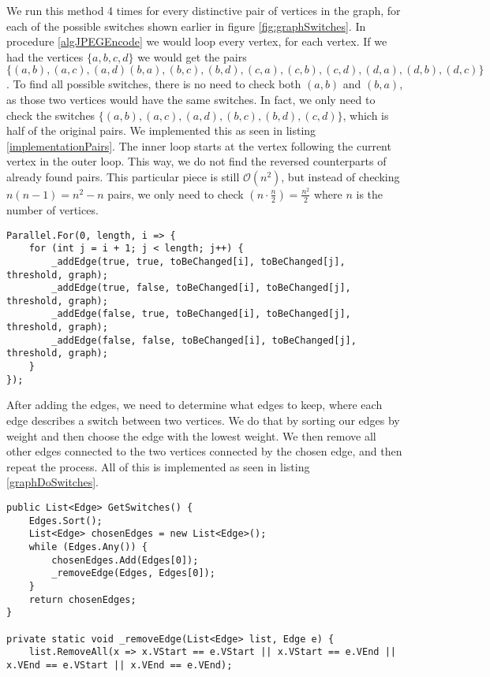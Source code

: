 We run this method 4 times for every distinctive pair of vertices in the graph, for each of the possible switches shown earlier in figure \ref{fig:graphSwitches}.
In procedure \ref{algJPEGEncode} we would loop every vertex, for each vertex.
If we had the vertices $\{a,b,c,d\}$ we would get the pairs $\{(a,b),(a,c),(a,d)(b,a),(b,c),(b,d),(c,a),(c,b),(c,d),(d,a),(d,b),(d,c)\}$.
To find all possible switches, there is no need to check both $(a,b)$ and $(b,a)$, as those two vertices would have the same switches.
In fact, we only need to check the switches $\{(a,b),(a,c),(a,d),(b,c),(b,d),(c,d)\}$, which is half of the original pairs.
We implemented this as seen in listing \ref{implementationPairs}.
The inner loop starts at the vertex following the current vertex in the outer loop.
This way, we do not find the reversed counterparts of already found pairs.
This particular piece is still $\mathcal{O}(n^2)$, but instead of checking $n(n-1)=n^2-n$ pairs, we only need to check $(n\cdot\frac{n}{2})=\frac{n^2}{2}$ where $n$ is the number of vertices. 


\begin{lstlisting}[firstnumber=655,label=implementationPairs,caption={Checks all edges between distincive pairs of vertices \textbf{File: }JPEGImage.cs}]
Parallel.For(0, length, i => {
    for (int j = i + 1; j < length; j++) {
        _addEdge(true, true, toBeChanged[i], toBeChanged[j], threshold, graph);
        _addEdge(true, false, toBeChanged[i], toBeChanged[j], threshold, graph);
        _addEdge(false, true, toBeChanged[i], toBeChanged[j], threshold, graph);
        _addEdge(false, false, toBeChanged[i], toBeChanged[j], threshold, graph);
    }
});
\end{lstlisting}

After adding the edges, we need to determine what edges to keep, where each edge describes a switch between two vertices.
We do that by sorting our edges by weight and then choose the edge with the lowest weight. We then remove all other edges connected to the two vertices connected by the chosen edge, and then repeat the process.
All of this is implemented as seen in listing \ref{graphDoSwitches}.

\begin{lstlisting}[firstnumber=14,label=graphDoSwitches, caption={Implementation of greedy algorithm for choosing switches \textbf{File: }JPEGImage.cs}]
public List<Edge> GetSwitches() {
    Edges.Sort();
    List<Edge> chosenEdges = new List<Edge>();
    while (Edges.Any()) {
        chosenEdges.Add(Edges[0]);
        _removeEdge(Edges, Edges[0]);
    }
    return chosenEdges;
}

private static void _removeEdge(List<Edge> list, Edge e) {
    list.RemoveAll(x => x.VStart == e.VStart || x.VStart == e.VEnd || x.VEnd == e.VStart || x.VEnd == e.VEnd);

\end{lstlisting}

